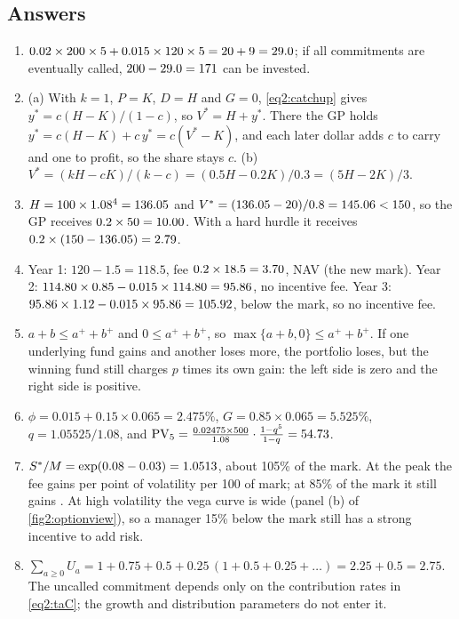 \begin{chapterrefs}
\subsection*{Answers}
\begin{enumerate}[label=\textbf{\thechapter.\arabic*}, leftmargin=*]
  \item $0.02\times200\times5 + 0.015\times120\times5 = 20 + 9 = 29.0$; if all commitments are
        eventually called, $200 - 29.0 = 171$ can be invested.
  \item (a) With $k=1$, $P=K$, $D=H$ and $G=0$, \cref{eq2:catchup} gives $y^* = c(H-K)/(1-c)$, so
        $V^* = H + y^*$. There the GP holds $y^* = c(H-K) + c\,y^* = c(V^*-K)$, and each later dollar
        adds $c$ to carry and one to profit, so the share stays $c$. (b) $V^* = (kH - cK)/(k-c) =
        (0.5H - 0.2K)/0.3 = (5H - 2K)/3$.
  \item $H = 100\times1.08^4 = 136.05$ and $V^* = (136.05 - 20)/0.8 = 145.06 < 150$, so the
        GP receives $0.2\times50 = 10.00$. With a hard hurdle it receives
        $0.2\times(150 - 136.05) = 2.79$.
  \item Year 1: $120 - 1.5 = 118.5$, fee $0.2\times18.5 = 3.70$, NAV \exFourCloseOne{} (the new
        mark). Year 2: $114.80\times0.85 - 0.015\times114.80 = 95.86$, no
        incentive fee. Year 3: $95.86\times1.12 - 0.015\times95.86 = 105.92$,
        below the mark, so no incentive fee.
  \item $a + b \le a^{+} + b^{+}$ and $0 \le a^{+} + b^{+}$, so $\max\{a+b, 0\} \le a^{+} + b^{+}$. If one
        underlying fund gains and another loses more, the portfolio loses, but the winning fund still
        charges $p$ times its own gain: the left side is zero and the right side is positive.
  \item $\phi = 0.015 + 0.15\times0.065 = 2.475\%$, $G = 0.85\times0.065 = 5.525\%$,
        $q = 1.05525/1.08$, and $\mathrm{PV}_5 = \frac{0.02475\times500}{1.08}\cdot\frac{1-q^5}{1-q} = 54.73$.
  \item $S^*/M = \exp(0.08 - 0.03) = 1.0513$, about 105\% of the mark. At the peak the fee gains
        \exSevenVegaPeak{} per point of volatility per 100 of mark; at 85\% of the mark it still gains
        \exSevenVegaDown. At high volatility the vega curve is wide (panel (b) of
        \cref{fig2:optionview}), so a manager 15\% below the mark still has a strong incentive to add risk.
  \item $\sum_{a\ge0}U_a = 1 + 0.75 + 0.5 + 0.25\,(1 + 0.5 + 0.25 + \dots) = 2.25 + 0.5 = 2.75$. The
        uncalled commitment depends only on the contribution rates in \cref{eq2:taC}; the
        growth and distribution parameters do not enter it.
\end{enumerate}


\end{chapterrefs}
